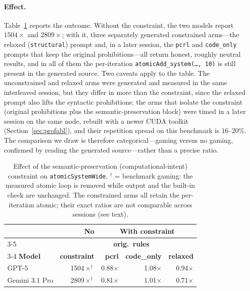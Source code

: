 \paragraph{Effect.}
Table~\ref{tab:intent} reports the outcome. Without the constraint, the two models report
$1504\times$ and $2809\times$; with it, three separately generated constrained arms---the relaxed
(\texttt{structural}) prompt and, in a later session, the \texttt{pcrl} and \texttt{code\_only} prompts
that keep the original prohibitions---all return honest, roughly neutral results, and in all of them the
per-iteration \texttt{atomicAdd\_system(\ldots,\,10)} is still present in the generated source. Two
caveats apply to the table. The unconstrained and relaxed arms were generated and measured in the same
interleaved session, but they differ in more than the constraint, since the relaxed prompt also lifts
the syntactic prohibitions; the arms that isolate the constraint (original prohibitions plus the
semantic-preservation block) were timed in a later session on the same node, rebuilt with a newer
CUDA toolkit (Section~\ref{sec:profabl}), and their repetition spread on this benchmark is $16$--$20\%$.
The comparison we draw is therefore categorical---gaming versus no
gaming, confirmed by reading the generated source---rather than a precise ratio.

\begin{table}[t]
\centering
\footnotesize
\setlength{\tabcolsep}{3pt}
\caption{Effect of the semantic-preservation (computational-intent) constraint on
  \texttt{atomicSystemWide}. $^\dagger$ = benchmark gaming: the measured atomic loop is removed while
  output and the built-in check are unchanged. The constrained arms all retain the per-iteration
  atomic; their exact ratios are not comparable across sessions (see text).}
\label{tab:intent}
\begin{tabular}{@{}lrrrr@{}}
\toprule
 & \textbf{No} & \multicolumn{3}{c}{\textbf{With constraint}} \\
\cmidrule(lr){3-5}
 & & \multicolumn{2}{c}{\textbf{orig.\ rules}} & \\
\cmidrule(lr){3-4}
\textbf{Model} & \textbf{constraint} & \textbf{pcrl} & \textbf{code\_only} & \textbf{relaxed} \\
\midrule
GPT-5          & 1504$\times^\dagger$ & 0.88$\times$ & 1.08$\times$ & 0.94$\times$ \\
Gemini 3.1 Pro & 2809$\times^\dagger$ & 0.81$\times$ & 1.01$\times$ & 0.71$\times$ \\
\bottomrule
\end{tabular}
\end{table}

